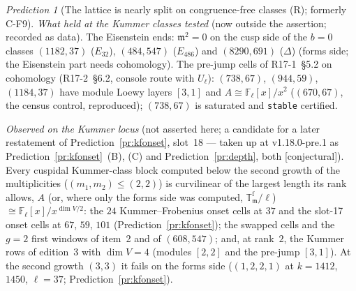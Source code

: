 \documentclass[11pt]{article}
\theoremstyle{remark}
\newtheorem{prediction}[theorem]{Prediction}
\newcommand{\F}{\mathbb{F}}
\newcommand{\Fl}{\F_\ell}
\newcommand{\T}{\mathbb{T}}
\newcommand{\m}{\mathfrak{m}}
\newcommand{\CONJ}{\textsf{[conjectural]}}
\begin{document}
\begin{prediction}[The lattice is nearly split on congruence-free classes (R); formerly C-F9]
\emph{What held at the Kummer classes tested} (now outside the assertion; recorded as data). The Eisenstein ends: $\m^2=0$ on the cusp side of the $b=0$
classes $(1182,37)$ ($E_{32}$), $(484,547)$ ($E_{486}$) and $(8290,691)$ ($\Delta$) (forms side; the Eisenstein part needs cohomology). The pre-jump
cells of R17-1~\S5.2 on cohomology (R17-2~\S6.2, console route with $U_\ell$): $(738,67)$, $(944,59)$, $(1184,37)$ have module Loewy layers $[3,1]$ and
$A\cong\Fl[x]/x^2$ ($(670,67)$, the census control, reproduced); $(738,67)$ is saturated and \texttt{stable} certified.

\emph{Observed on the Kummer locus} (not asserted here; a candidate for a later restatement of Prediction~\ref{pr:kfonset}, slot~18 --- taken up at v1.18.0-pre.1
as Prediction~\ref{pr:kfonset}~(B), (C) and Prediction~\ref{pr:depth}, both \CONJ). Every cuspidal Kummer-class block
computed below the second growth of the multiplicities ($(m_1,m_2)\le(2,2)$) is curvilinear of the largest length its rank allows, $A$ (or, where only the forms side
was computed, $\T^{\mathrm f}_\m/\ell$) $\cong\Fl[x]/x^{\dim V/2}$: the $24$ Kummer--Frobenius onset cells at $37$ and the slot-17 onset cells at $67$, $59$, $101$
(Prediction~\ref{pr:kfonset}); the swapped cells and the $g=2$ first windows of item~2 and of $(608,547)$; and, at rank~$2$, the Kummer rows of edition~3 with
$\dim V=4$ (modules $[2,2]$ and the pre-jump $[3,1]$). At the second growth $(3,3)$ it fails on the forms side ($(1,2,2,1)$ at $k=1412$, $1450$, $\ell=37$;
Prediction~\ref{pr:kfonset}).


\end{prediction}
\end{document}
